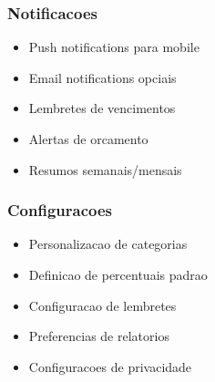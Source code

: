 \subsubsection{Notificacoes}
\begin{itemize}
    \item Push notifications para mobile
    \item Email notifications opciais
    \item Lembretes de vencimentos
    \item Alertas de orcamento
    \item Resumos semanais/mensais
\end{itemize}

\subsubsection{Configuracoes}
\begin{itemize}
    \item Personalizacao de categorias
    \item Definicao de percentuais padrao
    \item Configuracao de lembretes
    \item Preferencias de relatorios
    \item Configuracoes de privacidade
\end{itemize}
